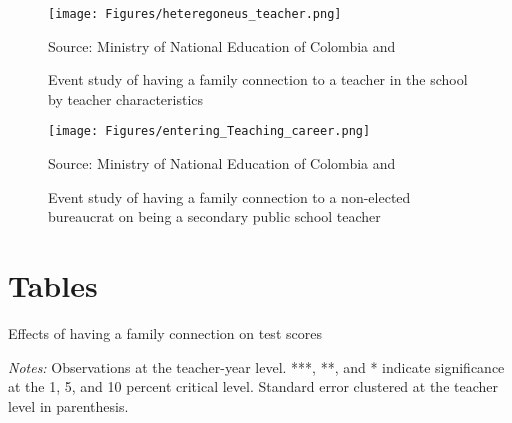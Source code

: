 \documentclass[12pt,runningheads]{article}
\newcommand\fnote[1]{\captionsetup{font=small}\caption*{#1}}
\begin{document}
\begin{figure}[H]
   \caption{Event study of having a family connection to a teacher in the school by teacher characteristics}
   \label{fig:event_study_teacher}
    \centering
    \texttt{[image: Figures/heteregoneus\_teacher.png]}
    \fnote{Source: Ministry of National Education of Colombia and \cite{Riano2021}}
\end{figure}

\begin{figure}[H]
   \caption{Event study of having a family connection to a non-elected bureaucrat on being a secondary public school teacher}
   \label{fig:entering}
    \centering
    \texttt{[image: Figures/entering\_Teaching\_career.png]}
    \fnote{Source: Ministry of National Education of Colombia and \cite{Riano2021}}
\end{figure}



\newpage
\section*{Tables}

\begin{table}[H]
\renewcommand*{\arraystretch}{1.2}
\end{table}


\newpage
\begin{table}[H]
\renewcommand*{\arraystretch}{1.2}
\begin{threeparttable}
\centering
\caption{Effects of having a family connection on test scores}
\label{table:tab_results}

\begin{tablenotes}
\footnotesize
\item \textit{Notes:} Observations at the teacher-year level. ***, **, and * indicate significance at the 1, 5, and 10 percent critical level. Standard error clustered at the teacher level in parenthesis. 
\end{tablenotes}
\end{threeparttable}
\end{table}
\end{document}
